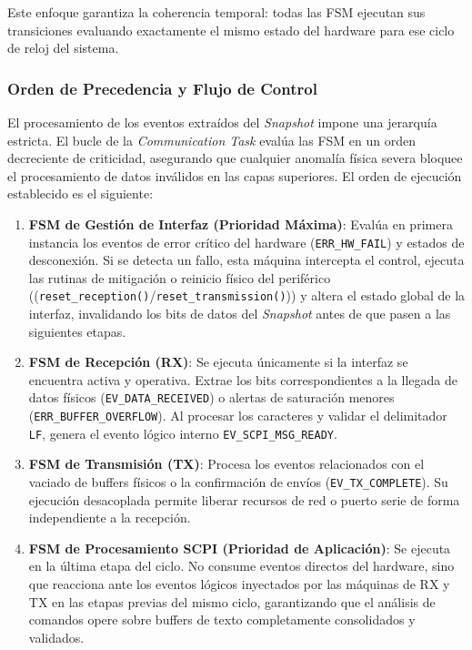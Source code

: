 Este enfoque garantiza la coherencia temporal: todas las FSM ejecutan sus transiciones evaluando exactamente el mismo estado del hardware para ese ciclo de reloj del sistema.

\subsubsection{Orden de Precedencia y Flujo de Control}

El procesamiento de los eventos extraídos del \textit{Snapshot} impone una jerarquía estricta. El bucle de la \textit{Communication Task} evalúa las FSM en un orden decreciente de criticidad, asegurando que cualquier anomalía física severa bloquee el procesamiento de datos inválidos en las capas superiores. El orden de ejecución establecido es el siguiente:

\begin{enumerate}
    \item \textbf{FSM de Gestión de Interfaz (Prioridad Máxima)}: Evalúa en primera instancia los eventos de error crítico del hardware (\texttt{ERR\_HW\_FAIL}) y estados de desconexión. Si se detecta un fallo, esta máquina intercepta el control, ejecuta las rutinas de mitigación o reinicio físico del periférico ((\texttt{reset\_re\-ception()}/\texttt{reset\_trans\-mission()})) y altera el estado global de la interfaz, invalidando los bits de datos del \textit{Snapshot} antes de que pasen a las siguientes etapas.
    \item \textbf{FSM de Recepción (RX)}: Se ejecuta únicamente si la interfaz se encuentra activa y operativa. Extrae los bits correspondientes a la llegada de datos físicos (\texttt{EV\_DATA\_RECEIVED}) o alertas de saturación menores (\texttt{ERR\_BUFFER\_OVERFLOW}). Al procesar los caracteres y validar el delimitador \texttt{LF}, genera el evento lógico interno \texttt{EV\_SCPI\_MSG\_READY}.
    \item \textbf{FSM de Transmisión (TX)}: Procesa los eventos relacionados con el vaciado de buffers físicos o la confirmación de envíos (\texttt{EV\_TX\_COMPLETE}). Su ejecución desacoplada permite liberar recursos de red o puerto serie de forma independiente a la recepción.
    \item \textbf{FSM de Procesamiento SCPI (Prioridad de Aplicación)}: Se ejecuta en la última etapa del ciclo. No consume eventos directos del hardware, sino que reacciona ante los eventos lógicos inyectados por las máquinas de RX y TX en las etapas previas del mismo ciclo, garantizando que el análisis de comandos opere sobre buffers de texto completamente consolidados y validados.
\end{enumerate}

